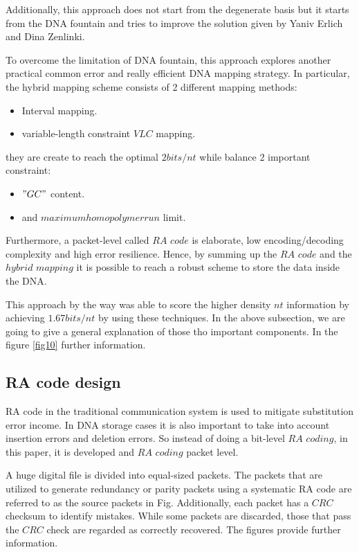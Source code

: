 \documentclass[10pt,twocolumn,twoside]{gsajnl}
\theoremstyle{definition}
\begin{document}
Additionally, this approach does not start from the degenerate basis but it starts from the DNA fountain and tries to improve the solution given by Yaniv Erlich and Dina Zenlinki.

To overcome the limitation of DNA fountain, this approach explores another practical common error and really efficient DNA mapping strategy. In particular, the hybrid mapping scheme consists of 2 different mapping methods: 
\begin{itemize}
    \item Interval mapping.
    \item variable-length constraint $VLC$ mapping.
\end{itemize}
they are create to reach the optimal $2bits/nt$ while balance 2 important constraint:
\begin{itemize}
    \item $"GC"$ content.
    \item and $maximum homopolymer run$ limit.
\end{itemize}
Furthermore, a packet-level called $RA$ $code$ is elaborate, low encoding/decoding complexity and high error resilience. Hence, by summing up the $RA$ $code$ and the $hybrid$ $ mapping$ it is possible to reach a robust scheme to store the data inside the DNA.

This approach by the way was able to score the higher density $nt$ information by achieving $1.67bits/nt$ by using these techniques. In the above subsection, we are going to give a general explanation of those tho important components. In the figure \ref{fig10} further information.

\subsection{RA code design}
RA code in the traditional communication system is used to mitigate substitution error income. In DNA storage cases it is also important to take into account insertion errors and deletion errors. So instead of doing a bit-level $RA$ $coding$, in this paper, it is developed and $RA$ $coding$ packet level.

A huge digital file is divided into equal-sized packets. The packets that are utilized to generate redundancy or parity packets using a systematic RA code are referred to as the source packets in Fig. Additionally, each packet has a $CRC$ checksum to identify mistakes. While some packets are discarded, those that pass the $CRC$ check are regarded as correctly recovered. The figures provide further information.
\end{document}

